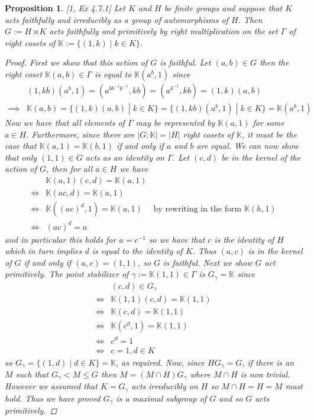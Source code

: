 \documentclass[]{article}
\newtheorem{prop}[thm]{Proposition}
\theoremstyle{definition}
\begin{document}
\begin{prop} \emph{[1, Ex 4.7.1]}
	Let $K$ and $H$ be finite groups and suppose that $K$ acts faithfully and irreducibly as a group of automorphisms of $H$. Then $G:=H \rtimes K$ acts faithfully and primitively by right multiplication on the set $\Gamma$ of right cosets of $\mathbb{K}:=\{(1,k) \; | \; k \in K \}$.
	
\begin{proof}
	First we show that this action of $G$ is faithful. Let $(a,b)\in G$ then the right coset $\mathbb{K}(a,b) \in \Gamma$ is equal to $\mathbb{K}(a^b,1)$ since 
	\begin{align*}
		& (1,kb)(a^b,1)=(a^{bb^{-1}k^{-1}},kb)=(a^{k^{-1}},kb)=(1,k)(a,b) \\
		\implies & \mathbb{K}(a,b) = \{(1,k)(a,b) \; | \; k \in K \} = \{(1,kb)(a^b,1) \; | \; k \in K \} = \mathbb{K}(a^b,1)
	\end{align*}
	Now we have that all elements of $\Gamma$ may be represented by $\mathbb{K}(a,1)$ for some $a \in H$. Furthermore, since there are $|G:\mathbb{K}|=|H|$ right cosets of $\mathbb{K}$, it must be the case that $\mathbb{K}(a,1)=\mathbb{K}(b,1)$ if and only if $a$ and $b$ are equal. We can now show that only $(1,1)\in G$ acts as an identity on $\Gamma$. Let $(c,d)$ be in the kernel of the action of $G$, then for all $a \in H$ we have
	\begin{align*}
		& \mathbb{K}(a,1)(c,d) = \mathbb{K}(a,1)& \\
		\iff & \mathbb{K}(ac,d) = \mathbb{K}(a,1)& \\
		\iff & \mathbb{K}((ac)^d,1) = \mathbb{K}(a,1)& \mbox{by rewriting in the form } \mathbb{K}(h,1) \\
		\iff & (ac)^d=a & 
	\end{align*}
	and in particular this holds for $a=c^{-1}$ so we have that $c$ is the identity of $H$ which in turn implies $d$ is equal to the identity of $K$. Thus $(a,c)$ is in the kernel of $G$ if and only if $(a,c)=(1,1)$, so $G$ is faithful. Next we show $G$ act primitively. The point stabilizer of $\gamma := \mathbb{K}(1,1) \in \Gamma$ is $G_\gamma = \mathbb{K}$ since
	\begin{align*}
		& (c,d) \in G_\gamma \\
		\iff & \mathbb{K}(1,1)(c,d) = \mathbb{K}(1,1) \\
		\iff & \mathbb{K}(c,d) = \mathbb{K}(1,1) \\
		\iff & \mathbb{K}(c^d,1)= \mathbb{K}(1,1) \\
		\iff & c^d=1 \\
		\iff & c=1, d \in K
	\end{align*}  
	so $G_\gamma = \{(1,d) \; | \; d \in K \}=\mathbb{K}$, as required. Now, since $HG_\gamma =G$, if there is an $M$ such that $G_\gamma < M \leqslant G$ then $M=(M \cap H)G_\gamma$ where $M \cap H$ is non trivial. However we assumed that $K=G_\gamma$ acts irreducibly on $H$ so $M \cap H = H = M$ must hold. Thus we have proved $G_\gamma$ is a maximal subgroup of $G$ and so $G$ acts primitively.
\end{proof}
\end{prop}
\end{document}
